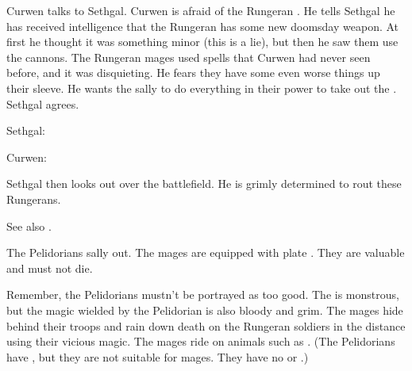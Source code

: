 Curwen talks to Sethgal.
Curwen is afraid of the Rungeran \ishrah.
He tells Sethgal he has received intelligence that the Rungeran \ishrah has some new doomsday weapon.
At first he thought it was something minor (this is a lie), but then he saw them use the cannons.
The Rungeran mages used spells that Curwen had never seen before, and it was disquieting.
He fears they have some even worse things up their sleeve. 
He wants the sally to do everything in their power to take out the \ishrah. 
Sethgal agrees. 

Sethgal:

Curwen:

Sethgal then looks out over the battlefield.
He is grimly determined to rout these Rungerans. 


See also \cite{RobertEHoward:KingsoftheNight}. 




\begin{comment}
  \section{Sally}
\end{comment}
\new
The Pelidorians sally out. 
The \ishrah{} mages are equipped with plate \armour. 
They are valuable and must not die. 

Remember, the Pelidorians mustn't be portrayed as too good. 
The  is monstrous, but the magic wielded by the Pelidorian \ishrah{} is also bloody and grim.
The mages hide behind their troops and rain down death on the Rungeran soldiers in the distance using their vicious magic. 
The mages ride on animals such as \relcs. 
(The Pelidorians have \grulcans, but they are not suitable for mages. They have no \lothae or \mezolisks.)

